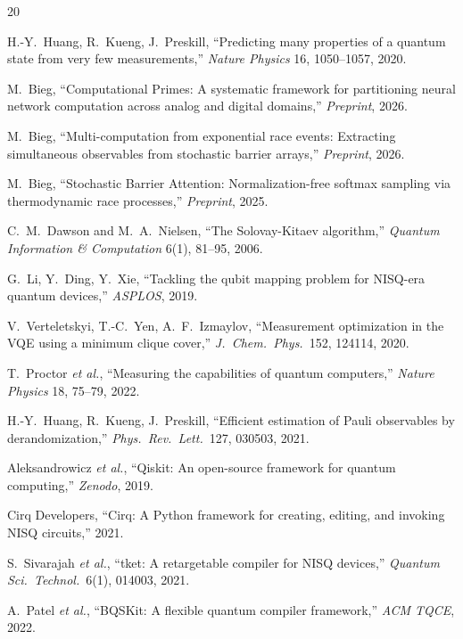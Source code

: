 \documentclass[11pt]{article}
\begin{document}
\begin{thebibliography}{20}

 H.-Y.~Huang, R.~Kueng, J.~Preskill, ``Predicting many properties of a quantum state from very few measurements,'' \textit{Nature Physics} 16, 1050--1057, 2020.

 M.~Bieg, ``Computational Primes: A systematic framework for partitioning neural network computation across analog and digital domains,'' \textit{Preprint}, 2026.

 M.~Bieg, ``Multi-computation from exponential race events: Extracting simultaneous observables from stochastic barrier arrays,'' \textit{Preprint}, 2026.

 M.~Bieg, ``Stochastic Barrier Attention: Normalization-free softmax sampling via thermodynamic race processes,'' \textit{Preprint}, 2025.

 C.~M.~Dawson and M.~A.~Nielsen, ``The Solovay-Kitaev algorithm,'' \textit{Quantum Information \& Computation} 6(1), 81--95, 2006.

 G.~Li, Y.~Ding, Y.~Xie, ``Tackling the qubit mapping problem for NISQ-era quantum devices,'' \textit{ASPLOS}, 2019.

 V.~Verteletskyi, T.-C.~Yen, A.~F.~Izmaylov, ``Measurement optimization in the VQE using a minimum clique cover,'' \textit{J.\ Chem.\ Phys.}\ 152, 124114, 2020.

 T.~Proctor \textit{et al.}, ``Measuring the capabilities of quantum computers,'' \textit{Nature Physics} 18, 75--79, 2022.

 H.-Y.~Huang, R.~Kueng, J.~Preskill, ``Efficient estimation of Pauli observables by derandomization,'' \textit{Phys.\ Rev.\ Lett.}\ 127, 030503, 2021.

 Aleksandrowicz \textit{et al.}, ``Qiskit: An open-source framework for quantum computing,'' \textit{Zenodo}, 2019.

 Cirq Developers, ``Cirq: A Python framework for creating, editing, and invoking NISQ circuits,'' 2021.

 S.~Sivarajah \textit{et al.}, ``tket: A retargetable compiler for NISQ devices,'' \textit{Quantum Sci.\ Technol.}\ 6(1), 014003, 2021.

 A.~Patel \textit{et al.}, ``BQSKit: A flexible quantum compiler framework,'' \textit{ACM TQCE}, 2022.


\end{thebibliography}
\end{document}
